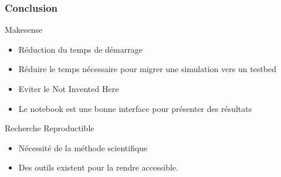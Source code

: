 
\begin{frame}\frametitle{Conclusion}

  \begin{alertblock}{Makesense}
    \begin{itemize}
      \item Réduction du temps de démarrage
      \item Réduire le temps nécessaire pour migrer une simulation vers un testbed
      \item Eviter le Not Invented Here
      \item Le notebook est une bonne interface pour présenter des résultats
    \end{itemize}
  \end{alertblock}

  \begin{alertblock}{Recherche Reproductible}
  \begin{itemize}
    \item Nécessité de la méthode scientifique
    \item Des outils existent pour la rendre accessible.
  \end{itemize}
  \end{alertblock}

\end{frame}




